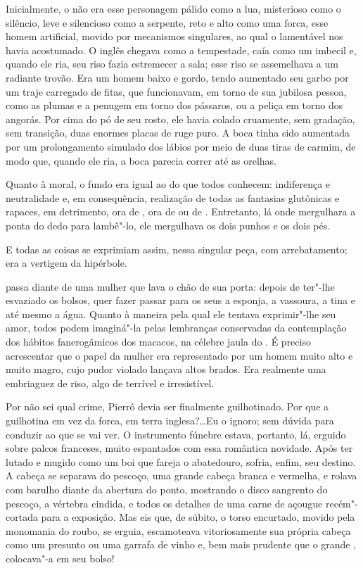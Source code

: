 Inicialmente, o  não era esse personagem pálido como a lua,
misterioso como o silêncio, leve e silencioso como a serpente, reto e
alto como uma forca, esse homem artificial, movido por mecanismos
singulares, ao qual o lamentável  nos havia acostumado. O
 inglês chegava como a tempestade, caía como um imbecil e, quando
ele ria, seu riso fazia estremecer a sala; esse riso se assemelhava a
um radiante trovão. Era um homem baixo e gordo, tendo aumentado seu
garbo por um traje carregado de fitas, que funcionavam, em torno de sua
jubilosa pessoa, como as plumas e a penugem em torno dos pássaros, ou a
peliça em torno dos angorás. Por cima do pó de seu rosto, ele havia
colado cruamente, sem gradação, sem transição, duas enormes placas de
ruge puro. A boca tinha sido aumentada por um prolongamento simulado
dos lábios por meio de duas tiras de carmim, de modo que, quando ele
ria, a boca parecia correr até as orelhas.

Quanto à moral, o fundo era igual ao do  que todos conhecem:
indiferença e neutralidade e, em consequência, realização de todas as
fantasias glutônicas e rapaces, em detrimento, ora de , ora de
 ou de . Entretanto, lá onde  mergulhara a
ponta do dedo para lambê"-lo, ele mergulhava os dois punhos e os dois
pés.

E todas as coisas se exprimiam assim, nessa singular peça, com
arrebatamento; era a vertigem da hipérbole.

 passa diante de uma mulher que lava o chão de sua porta: depois
de ter"-lhe esvaziado os bolsos, quer fazer passar para os seus a
esponja, a vassoura, a tina e até mesmo a água. Quanto à maneira pela
qual ele tentava exprimir"-lhe seu amor, todos podem imaginá"-la pelas
lembranças conservadas da contemplação dos hábitos fanerogâmicos dos
macacos, na célebre jaula do . É preciso acrescentar
que o papel da mulher era representado por um homem muito alto e muito
magro, cujo pudor violado lançava altos brados. Era realmente uma
embriaguez de riso, algo de terrível e irresistível.

Por não sei qual crime, Pierrô devia ser finalmente guilhotinado. Por
que a guilhotina em vez da forca, em terra inglesa?\ldots Eu o ignoro; sem
dúvida para conduzir ao que se vai ver. O instrumento fúnebre estava,
portanto, lá, erguido sobre palcos franceses, muito espantados com essa
romântica novidade. Após ter lutado e mugido como um boi que fareja o
abatedouro,  sofria, enfim, seu destino. A cabeça se separava do
pescoço, uma grande cabeça branca e vermelha, e rolava com barulho
diante da abertura do ponto, mostrando o disco sangrento do pescoço, a
vértebra cindida, e todos os detalhes de uma carne de açougue
recém"-cortada para a exposição. Mas eis que, de súbito, o torso
encurtado, movido pela monomania do roubo, se erguia, escamoteava
vitoriosamente sua própria cabeça como um presunto ou uma garrafa de
vinho e, bem mais prudente que o grande , colocava"-a em
seu bolso!

